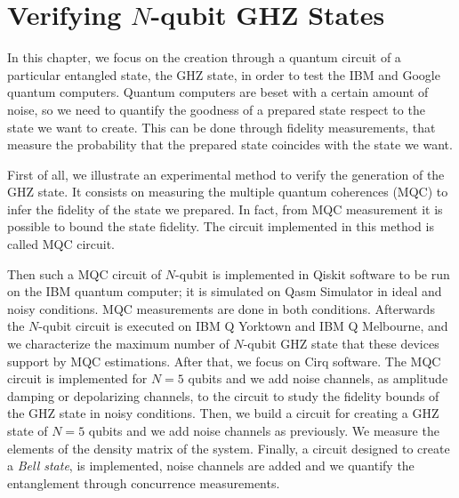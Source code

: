 \chapter{Verifying $N$-qubit GHZ States}
\label{chapter3}

In this chapter, we focus on the creation through a quantum circuit of a particular entangled state, the GHZ state, in order to test the IBM and Google quantum computers. 
Quantum computers are beset with a certain amount of noise, so we need to quantify the goodness of a prepared state respect to the state we want to create. 
This can be done through fidelity measurements, that measure the probability that the prepared state coincides with the state we want.

 First of all, we illustrate an experimental method to verify the generation of the GHZ state. It consists on measuring the multiple quantum coherences (MQC) \cite{Article} to infer the fidelity of the state we prepared. In fact, from MQC measurement it is possible to bound the state fidelity. The circuit implemented in this method is called MQC circuit.

Then such a MQC circuit of $N$-qubit is implemented in Qiskit software to be run on the IBM quantum computer; it is simulated on Qasm Simulator in ideal and noisy conditions. MQC measurements are done in both conditions. Afterwards the $N$-qubit circuit is executed on IBM Q Yorktown and IBM Q Melbourne, and we characterize the maximum number of $N$-qubit GHZ state that these devices support by MQC estimations.
After that, we focus on Cirq software. The MQC circuit is implemented for $N=5$ qubits and we add noise channels, as amplitude damping or depolarizing channels, to the circuit to study the fidelity bounds of the GHZ state in noisy conditions. Then, we build a circuit for creating a GHZ state of $N=5$ qubits and we add noise channels as previously. We measure the elements of the density matrix of the system. Finally, a circuit designed to create a \textit{Bell state}, is implemented, noise channels are added and we quantify the entanglement through concurrence measurements.



